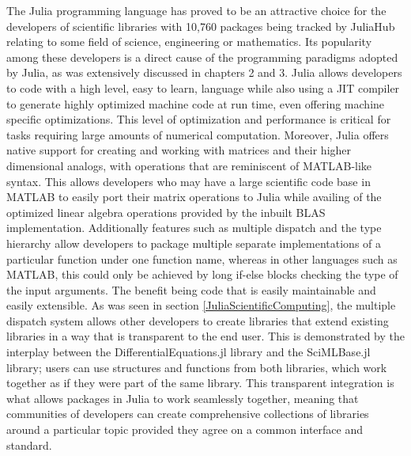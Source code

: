 The Julia programming language has proved to be an attractive choice for the developers of scientific libraries with
10,760 packages being tracked by JuliaHub relating to some field of science, engineering or mathematics. Its popularity
among these developers is a direct cause of the programming paradigms adopted by Julia, as was extensively discussed in
chapters 2 and 3. Julia allows developers to code with a high level, easy to learn, language while also using a JIT
compiler to generate highly optimized machine code at run time, even offering machine specific optimizations. This level
of optimization and performance is critical for tasks requiring large amounts of numerical computation. Moreover, Julia
offers native support for creating and working with matrices and their higher dimensional analogs, with operations that
are reminiscent of MATLAB-like syntax. This allows developers who may have a large scientific code base in MATLAB to easily
port their matrix operations to Julia while availing of the optimized linear algebra operations provided by the inbuilt
BLAS implementation. Additionally features such as multiple dispatch and the type hierarchy allow developers to
package multiple separate implementations of a particular function under one function name, whereas in other languages
such as MATLAB, this could only be achieved by long if-else blocks checking the type of the input arguments. The benefit
being code that is easily maintainable and easily extensible. As was seen in section \ref{JuliaScientificComputing}, the
multiple dispatch system allows other developers to create libraries that extend existing libraries in a way that is
transparent to the end user. This is demonstrated by the interplay between the DifferentialEquations.jl library and the
SciMLBase.jl library; users can use structures and functions from both libraries, which work together as if they were
part of the same library. This transparent integration is what allows packages in Julia to work seamlessly together,
meaning that communities of developers can create comprehensive collections of libraries around a particular topic
provided they agree on a common interface and standard.